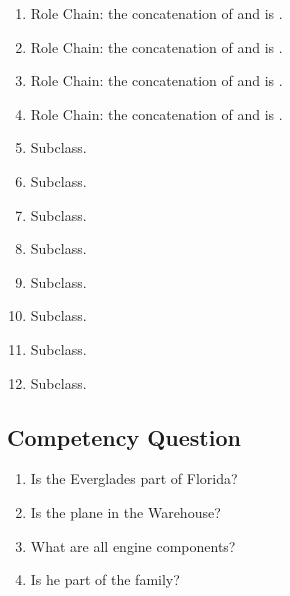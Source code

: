 \begin{enumerate}
\item Role Chain: the concatenation of \poFeaAct{} and \spatialLocIn{} is \spatialLocIn{}.
\item Role Chain: the concatenation of \spatialLocIn{} and \poFeaAct{} is \spatialLocIn{}.
\item Role Chain: the concatenation of \poPlaAre{} and \spatialLocIn{} is \spatialLocIn{}.
\item Role Chain: the concatenation of \spatialLocIn{} and \poPlaAre{} is \spatialLocIn{}.
\item Subclass.
\item Subclass.
\item Subclass.
\item Subclass.
\item Subclass.
\item Subclass.
\item Subclass.
\item Subclass.
\end{enumerate}

\subsection{Competency Question}
\label{cqs:Partonymy}
\begin{enumerate}[CQ1.]
\item Is the Everglades part of Florida?
\item Is the plane in the Warehouse?
\item What are all engine components?
\item Is he part of the family?
\end{enumerate}

\newpage
